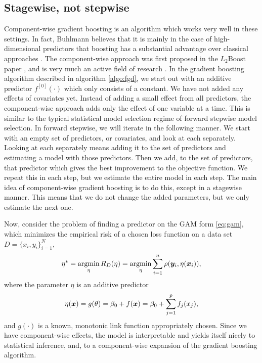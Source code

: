 \subsection{Stagewise, not stepwise}
Component-wise gradient boosting is an algorithm which works very well in these settings.
In fact, Buhlmann believes that it is mainly in the case of high-dimensional predictors that boosting has a substantial advantage over classical approaches \citep{buhlmann2006}.
The component-wise approach was first proposed in the $L_2$Boost paper \citep{buhlmann-yu}, and is very much an active field of research \citep{buhlmann2006, mayr14a, mayr14b, mayr17}.
In the gradient boosting algorithm described in algorithm \eqref{algo:fgd}, we start out with an additive predictor $f^{[0]}(\cdot)$ which only consists of a constant.
We have not added any effects of covariates yet.
Instead of adding a small effect from all predictors, the component-wise approach adds only the effect of one variable at a time.
This is similar to the typical statistical model selection regime of forward stepwise model selection.
In forward stepwise, we will iterate in the following manner.
We start with an empty set of predictors, or covariates, and look at each separately. Looking at each separately means adding it to the set of predictors and estimating a model with those predictors.
Then we add, to the set of predictors, that predictor which gives the best improvement to the objective function.
We repeat this in each step, but we estimate the entire model in each step.
The main idea of component-wise gradient boosting is to do this, except in a stagewise manner.
This means that we do not change the added parameters, but we only estimate the next one.

Now, consider the problem of finding a predictor on the GAM form \eqref{eq:gam}, which minimizes the empirical risk of a chosen loss function on a data set $D=\{x_i,y_i\}_{i=1}^N$,
\begin{equation}\label{eq:argmin-eta}
    \eta^*=\operatorname*{argmin}_{\eta}R_D(\eta)=\operatorname*{argmin}_{\eta}\sum_{i=1}^n\rho(\bm{y}_i,\eta(\bm{x}_i)),
\end{equation}
where the parameter $\eta$ is an additive predictor
\begin{equation}
    \eta(\bm{x})=g(\theta)=\beta_0+f(\bm{x})=\beta_0+\sum_{j=1}^p f_j(x_j),
\end{equation}
and $g(\cdot)$ is a known, monotonic link function appropriately chosen.
Since we have component-wise effects, the model is interpretable and yields itself nicely to statistical inference, and, to a component-wise expansion of the gradient boosting algorithm.


